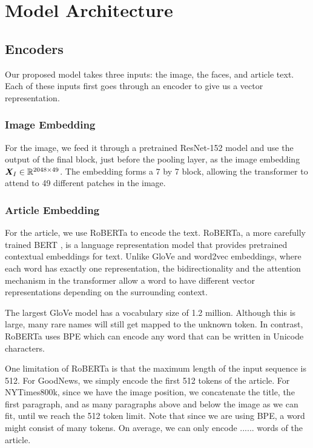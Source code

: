 
\section{Model Architecture}

\subsection{Encoders}

Our proposed model takes three inputs: the image, the faces, and article text.
Each of these inputs first goes through an encoder to give us a vector
representation.

\subsubsection{Image Embedding}

For the image, we feed it through a pretrained ResNet-152 model
\cite{He2016ResNet} and use the output of the final block, just before the
pooling layer, as the image embedding $\bm{X}_I \in \mathbb{R}^{2048 \times 49}$.
The embedding forms a 7 by 7 block, allowing the transformer to attend to 49
different patches in the image.

\subsubsection{Article Embedding}

For the article, we use RoBERTa \cite{Liu2019RoBERTaAR} to encode the text.
RoBERTa, a more carefully trained BERT \cite{Devlin2019BERT}, is a language
representation model that provides pretrained contextual embeddings for text.
Unlike GloVe \cite{Pennington2014Glove} and word2vec
\cite{Mikolov2013DistributedRO} embeddings, where each word has exactly one
representation, the bidirectionality and the attention mechanism in the
transformer allow a word to have different vector representations depending on
the surrounding context.

The largest GloVe model has a vocabulary size of 1.2 million. Although this is
large, many rare names will still get mapped to the unknown token. In contrast,
RoBERTa uses BPE \cite{Sennrich2015NeuralMT,Radford2019LanguageMA} which can
encode any word that can be written in Unicode characters.

One limitation of RoBERTa is that the maximum length of the input sequence is
512. For GoodNews, we simply encode the first 512 tokens of the article. For
NYTimes800k, since we have the image position, we concatenate the title, the
first paragraph, and as many paragraphs above and below the image as we can
fit, until we reach the 512 token limit. Note that since we are using BPE, a
word might consist of many tokens. On average, we can only encode ...... words
of the article.

